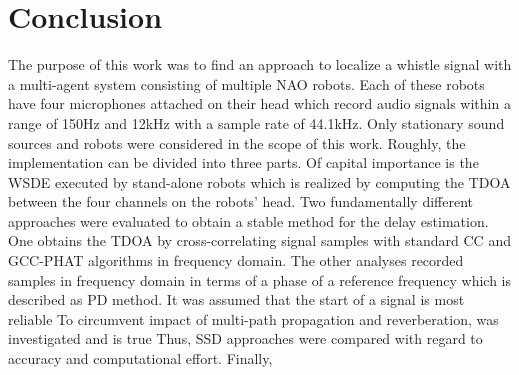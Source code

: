 \chapter{Conclusion}
\label{chap:05_conclusion}

\begin{comment}
    - Objective of this work:
        x a whistle sound locator (in xy-plane) with multiple robots
        x stationary robots and sources
        x evaluated different tdoa methods
        - found a approach to detect direction of source on single robots
\end{comment}

The purpose of this work was to find an approach to localize a whistle
signal with a multi-agent system consisting of multiple NAO robots.
Each of these robots have four microphones attached on their head which
record audio signals within a range of 150\si{\hertz} and 12\si{\kilo\hertz}
with a sample rate of 44.1\si{\kilo\hertz}.
Only stationary sound sources and robots were considered in the scope of this
work.
Roughly, the implementation can be divided into three parts.
Of capital importance is the \acf{WSDE} executed by stand-alone robots which
is realized by computing the \ac{TDOA} between the four channels on the robots' head.
Two fundamentally different approaches were evaluated to obtain a stable method
for the delay estimation.
One obtains the \ac{TDOA} by cross-correlating signal samples with standard
\acf{CC} and \acf{GCC-PHAT} algorithms in frequency domain.
The other analyses recorded samples in frequency domain in terms of
a phase of a reference frequency which is described as \acf{PD} method.
It was assumed that the start of a signal is most reliable 
To circumvent impact of multi-path propagation and reverberation, 
was investigated and is true
Thus, \acf{SSD} approaches were compared with regard to accuracy and computational effort.
Finally, 






